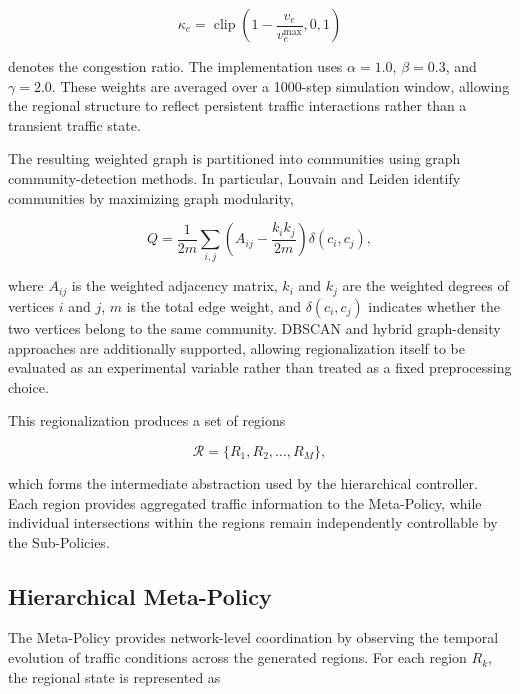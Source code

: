 \documentclass[3p,times]{elsarticle}
\theoremstyle{plain}
\theoremstyle{definition}
\begin{document}
\begin{equation}
\kappa_e =
\operatorname{clip}\!\left(1 - \frac{v_e}{v_e^{\max}}, 0, 1\right)
\end{equation}

denotes the congestion ratio. The implementation uses $\alpha = 1.0$,
$\beta = 0.3$, and $\gamma = 2.0$. These weights are averaged over a
1000-step simulation window, allowing the regional structure to
reflect persistent traffic interactions rather than a transient
traffic state.

The resulting weighted graph is partitioned into communities using
graph community-detection methods. In particular, Louvain and Leiden
identify communities by maximizing graph modularity,

\begin{equation}
Q = \frac{1}{2m}\sum_{i,j}
\left(A_{ij} - \frac{k_i k_j}{2m}\right)
\delta(c_i, c_j),
\end{equation}

where $A_{ij}$ is the weighted adjacency matrix, $k_i$ and $k_j$ are
the weighted degrees of vertices $i$ and $j$, $m$ is the total edge
weight, and $\delta(c_i, c_j)$ indicates whether the two vertices
belong to the same community. DBSCAN and hybrid graph-density
approaches are additionally supported, allowing regionalization itself
to be evaluated as an experimental variable rather than treated as a
fixed preprocessing choice.

This regionalization produces a set of regions

\begin{equation}
\mathcal{R} = \{R_1, R_2, \ldots, R_M\},
\end{equation}

which forms the intermediate abstraction used by the hierarchical
controller. Each region provides aggregated traffic information to the
Meta-Policy, while individual intersections within the regions remain
independently controllable by the Sub-Policies.


\subsection{Hierarchical Meta-Policy}\label{subsec3-6}

The Meta-Policy provides network-level coordination by observing the
temporal evolution of traffic conditions across the generated regions.
For each region $R_k$, the regional state is represented as
\end{document}
